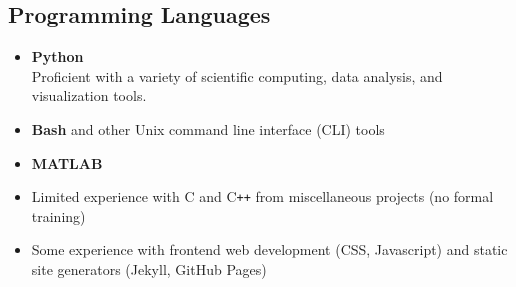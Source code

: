 \documentclass[10pt,a4paper,sans]{moderncv}
\begin{document}
\subsection{Programming Languages} \vspace{5pt}
\begin{itemize}[itemsep=0pt]
    \item \textbf{Python}\\
        Proficient with a variety of scientific computing, data analysis, and
        visualization tools.

    \item \textbf{Bash} and other Unix command line interface (CLI) tools

   \item \textbf{MATLAB}
   \item Limited experience with C and C\texttt{++} from miscellaneous projects (no formal training)
 \item Some experience with frontend web development (CSS, Javascript) and
       static site generators (Jekyll, GitHub Pages)
\end{itemize}
\end{document}
